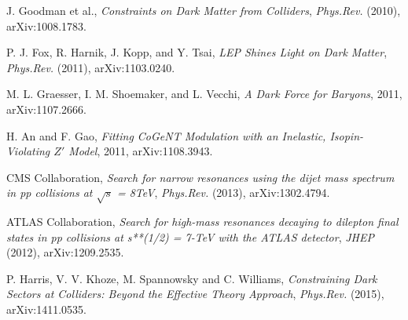 J. Goodman et al., \emph{Constraints on Dark Matter from Colliders}, \emph{Phys.Rev.} (2010), arXiv:1008.1783.

P. J. Fox, R. Harnik, J. Kopp, and Y. Tsai, \emph{LEP Shines Light on Dark Matter}, \emph{Phys.Rev.} (2011), arXiv:1103.0240.

M. L. Graesser, I. M. Shoemaker, and L. Vecchi, \emph{A Dark Force for Baryons}, 2011, arXiv:1107.2666.

H. An and F. Gao, \emph{Fitting CoGeNT Modulation with an Inelastic, Isopin-Violating $Z'$ Model}, 2011, arXiv:1108.3943.

CMS Collaboration, \emph{
Search for narrow resonances using the dijet mass spectrum in pp collisions at $\sqrt{s}$ = 8TeV}, \emph{Phys.Rev.} (2013), arXiv:1302.4794.

ATLAS Collaboration, \emph{Search for high-mass resonances decaying to dilepton final states in pp collisions at s**(1/2) = 7-TeV with the ATLAS detector}, \emph{JHEP} (2012), arXiv:1209.2535.

P. Harris, V. V. Khoze, M. Spannowsky and C. Williams, \emph{Constraining Dark Sectors at Colliders: Beyond the Effective Theory Approach}, \emph{Phys.Rev.} (2015), arXiv:1411.0535. 


